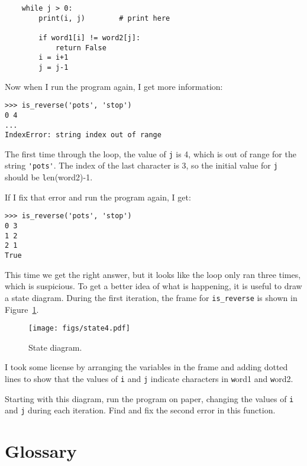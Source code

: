 \documentclass[
DIV=11,
fontsize=13,
twoside,
headinclude=false,
titlepage=firstiscover,
abstract=true,
headsepline=true,
footsepline=true,
chapterprefix=true, %
headings=big,
bibliography=totoc,%
captions=tableheading
]{scrbook}
\theoremstyle{definition}
\begin{document}
\begin{lstlisting}
    while j > 0:
        print(i, j)        # print here
        
        if word1[i] != word2[j]:
            return False
        i = i+1
        j = j-1
\end{lstlisting}
%
Now when I run the program again, I get more information:

\begin{lstlisting}
>>> is_reverse('pots', 'stop')
0 4
...
IndexError: string index out of range
\end{lstlisting}
%
The first time through the loop, the value of {\texttt j} is 4,
which is out of range for the string \verb"'pots'".
The index of the last character is 3, so the
initial value for {\texttt j} should be {\texttt len(word2)-1}.

If I fix that error and run the program again, I get:

\begin{lstlisting}
>>> is_reverse('pots', 'stop')
0 3
1 2
2 1
True
\end{lstlisting}
%
This time we get the right answer, but it looks like the loop only ran
three times, which is suspicious.  To get a better idea of what is
happening, it is useful to draw a state diagram.  During the first
iteration, the frame for \verb"is_reverse" is shown in
Figure~\ref{fig.state4}.   

\begin{figure}
\centerline
{\texttt{[image: figs/state4.pdf]}}
\caption{State diagram.}
\label{fig.state4}
\end{figure}

I took some license by arranging the variables in the frame
and adding dotted lines to show that the values of {\texttt i} and
{\texttt j} indicate characters in {\texttt word1} and {\texttt word2}.

Starting with this diagram, run the program on paper, changing the
values of {\texttt i} and {\texttt j} during each iteration.  Find and fix the
second error in this function.
\label{isreverse}


\section{Glossary}
\end{document}
